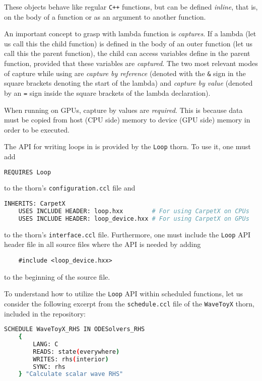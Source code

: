 These objects behave like regular \texttt{C++} functions, but can be defined \textit{inline}, that is, on the body of a function or as an argument to another function.

An important concept to grasp with lambda function is \textit{captures}. If a lambda (let us call this the child function) is defined in the body of an outer function (let us call this the parent function), the child can access variables define in the parent function, provided that these variables are \textit{captured}. The two most relevant modes of capture while using \CarpetX\space are \textit{capture by reference} (denoted with the \texttt{\&} sign in the square brackets denoting the start of the lambda) and \textit{capture by value} (denoted by an \texttt{=} sign inside the square brackets of the lambda declaration).

When running on GPUs, capture by values are \textit{required}. This is because data must be copied from host (CPU side) memory to device (GPU side) memory in order to be executed.

The API for writing loops in \CarpetX\space is provided by the \texttt{Loop} thorn. To use it, one must add
%
\begin{lstlisting}[language=Bash]
    REQUIRES Loop
\end{lstlisting}
%
to the thorn's \texttt{configuration.ccl} file and
%
\begin{lstlisting}[language=Bash]
    INHERITS: CarpetX   
    USES INCLUDE HEADER: loop.hxx        # For using CarpetX on CPUs
    USES INCLUDE HEADER: loop_device.hxx # For using CarpetX on GPUs
\end{lstlisting}
%
to the thorn's \texttt{interface.ccl} file. Furthermore, one must include the \texttt{Loop} API header file in all source files where the API is needed by adding
%
\begin{lstlisting}
    #include <loop_device.hxx>
\end{lstlisting}
%
to the beginning of the source file.

To understand how to utilize the \texttt{Loop} API within \Cactus\space scheduled functions, let us consider the following excerpt from the \texttt{schedule.ccl} file of the \texttt{WaveToyX} thorn, included in the \CarpetX\space repository:
%
\begin{lstlisting}[language=Bash]
    SCHEDULE WaveToyX_RHS IN ODESolvers_RHS
    {
        LANG: C
        READS: state(everywhere)
        WRITES: rhs(interior)
        SYNC: rhs
    } "Calculate scalar wave RHS"
\end{lstlisting}

